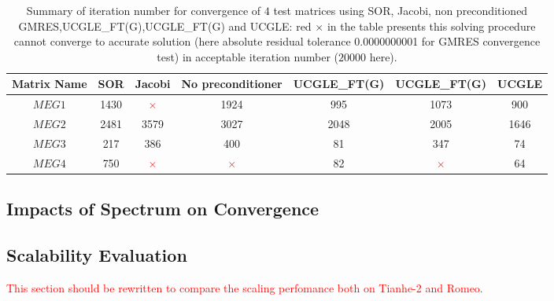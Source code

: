 \begin{table}[htbp]
	\footnotesize
	\renewcommand{\arraystretch}{1.2}
	\caption{Summary of iteration number for convergence of $4$ test matrices using SOR, Jacobi, non preconditioned GMRES,UCGLE\_FT(G),UCGLE\_FT(G) and UCGLE: red $\times$ in the table presents this solving procedure cannot converge to accurate solution (here absolute residual tolerance \num[round-precision=2,round-mode=figures]{0.0000000001} for GMRES convergence test) in acceptable iteration number ($20000$ here).}
	\label{iterations}
	\centering
	\begin{tabular}{*{7}{c}}
		\toprule
		\cellcolor{gray!50}Matrix Name& 	\cellcolor{gray!50}SOR & 	\cellcolor{gray!50}Jacobi & 	\cellcolor{gray!50}No preconditioner & 	\cellcolor{gray!50}UCGLE\_FT(G) &	\cellcolor{gray!50}UCGLE\_FT(G) & 	\cellcolor{gray!50}UCGLE \\
		\midrule
		$MEG1$  & 1430 & \textcolor{red}{$\times$} & 1924 & 995 & 1073 & \cellcolor{yellow}900\\
		
		\cellcolor{gray!20}$MEG2$  & 	\cellcolor{gray!20}2481 & 	\cellcolor{gray!20}3579 & 	\cellcolor{gray!20}3027 & 	\cellcolor{gray!20}2048 & 	\cellcolor{gray!20}2005 & \cellcolor{yellow}1646\\
		
		$MEG3$ & 217 & 386 & 400 & 81 & 347 & \cellcolor{yellow}74\\
		
		\cellcolor{gray!20}	$MEG4$ & 	\cellcolor{gray!20}750 & 	\cellcolor{gray!20}\textcolor{red}{$\times$} & 	\cellcolor{gray!20}\textcolor{red}{$\times$} & 	\cellcolor{gray!20}82 & 	\cellcolor{gray!20}\textcolor{red}{$\times$} & \cellcolor{yellow}64\\
		\bottomrule
	\end{tabular}
\end{table}

\subsection{Impacts of Spectrum on Convergence}

\subsection{Scalability Evaluation}

\textcolor{red}{This section should be rewritten to compare the scaling perfomance both on Tianhe-2 and Romeo. }

